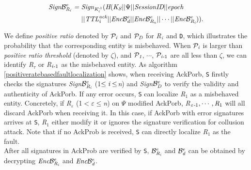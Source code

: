 \begin{equation}\label{signbri}
\begin{split}
\emph{Sign}\mathcal{B}_{\emph{R}_\emph{i}}^e ~\emph{=}~ &\emph{Sign}_{\emph{K}_\emph{i}^{\emph{-}1}}(\emph{H}(\emph{K}_\emph{S}\vert\vert\Psi\vert \vert\emph{SessionID}\vert\vert \emph{epoch}\\
&\vert \vert \emph{TTL}_{\emph{i}}^\emph{ack} \vert \vert\emph{Enc}\mathcal{B}_\emph{d}^e\vert \vert \emph{Enc}\mathcal{B}_{\emph{R}_\emph{n}}^e \vert \vert \cdots \vert \vert \emph{Enc}\mathcal{B}_{\emph{R}_\emph{i}}^e)).
\end{split}
\end{equation}

We define \emph{positive ratio} denoted by $\mathcal{P}_\emph{i}$ and $\mathcal{P}_\emph{D}$ for \emph{R}$_\emph{i}$ and {\tt D}, which illustrates the probability that the corresponding entity is misbehaved. When $\mathcal{P}_\emph{i}$ is larger than \emph{positive ratio threshold} (denoted by $\zeta$), and $\mathcal{P}_\emph{1}$, $\cdots$, $\mathcal{P}_{\emph{i-}1}$ are all less than $\zeta$, we can identify \emph{R}$_\tau$ or \emph{R}$_{\emph{i-}1}$ as the misbehaved entity.
As algorithm \ref{positiveratebasedfaultlocalization} shows, when receiving AckPorb, {\tt S} firstly checks the signatures \emph{Sign}$\mathcal{B}_{\emph{R}_\emph{i}}^e$ (1$\leq \emph{i} \leq$\emph{n}) and \emph{Sign}$\mathcal{B}_\emph{D}^e$ to verify the validity and authenticity of AckPorb. If any error occurs, {\tt S} can localize \emph{R}$_1$ as a misbehaved entity. Concretely, if \emph{R}$_\varepsilon$ (1$<\varepsilon\leq$\emph{n}) on $\Psi$ modified AckPorb, \emph{R}$_{\varepsilon\emph{-}1}, \cdots,\emph{R}_1$ will all discard AckPorb when receiving it. In this case, if AckPorb with error signatures arrives at {\tt S}, \emph{R}$_1$ either modify it or ignores the signature verification for collusion attack. Note that if no AckProb is received, {\tt S} can directly localize \emph{R}$_1$ as the fault.\\
\indent
After all signatures in AckProb are verified by {\tt S}, $\mathcal{B}_{\emph{R}_\emph{i}}^e$ and $\mathcal{B}_{\emph{d}}^e$ can be obtained by decrypting $\emph{Enc}\mathcal{B}_{\emph{R}_\emph{i}}^e$ and $\emph{Enc}\mathcal{B}_\emph{d}^e$. %
